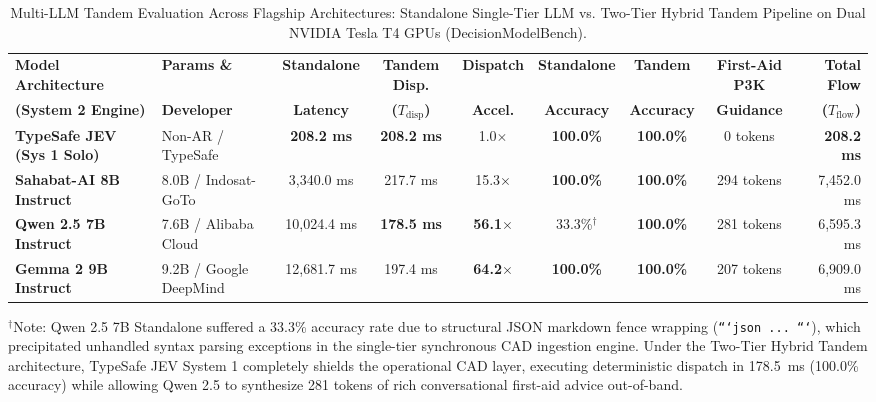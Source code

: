 \documentclass[journal,compsoc]{IEEEtran}
\begin{document}
\begin{table}[t]
\caption{Multi-LLM Tandem Evaluation Across Flagship Architectures: Standalone Single-Tier LLM vs. Two-Tier Hybrid Tandem Pipeline on Dual NVIDIA Tesla T4 GPUs (DecisionModelBench).}
\label{tab:multi_llm_tandem}
\centering
\footnotesize
\setlength{\tabcolsep}{2.5pt}
\begin{tabular*}{\textwidth}{@{\extracolsep{\fill}}llccccccr@{}}
\toprule
\textbf{Model Architecture} & \textbf{Params \&} & \textbf{Standalone} & \textbf{Tandem Disp.} & \textbf{Dispatch} & \textbf{Standalone} & \textbf{Tandem} & \textbf{First-Aid P3K} & \textbf{Total Flow} \\
\textbf{(System 2 Engine)} & \textbf{Developer} & \textbf{Latency} & \textbf{($T_{\text{disp}}$)} & \textbf{Accel.} & \textbf{Accuracy} & \textbf{Accuracy} & \textbf{Guidance} & \textbf{($T_{\text{flow}}$)} \\
\midrule
\textbf{TypeSafe JEV (Sys 1 Solo)} & Non-AR / TypeSafe & \textbf{208.2 ms} & \textbf{208.2 ms} & 1.0$\times$ & \textbf{100.0\%} & \textbf{100.0\%} & 0 tokens & \textbf{208.2 ms} \\
\midrule
\textbf{Sahabat-AI 8B Instruct} & 8.0B / Indosat-GoTo & 3,340.0 ms & 217.7 ms & 15.3$\times$ & \textbf{100.0\%} & \textbf{100.0\%} & 294 tokens & 7,452.0 ms \\
\textbf{Qwen 2.5 7B Instruct} & 7.6B / Alibaba Cloud & 10,024.4 ms & \textbf{178.5 ms} & \textbf{56.1$\times$} & 33.3\%$^\dagger$ & \textbf{100.0\%} & 281 tokens & 6,595.3 ms \\
\textbf{Gemma 2 9B Instruct} & 9.2B / Google DeepMind & 12,681.7 ms & 197.4 ms & \textbf{64.2$\times$} & \textbf{100.0\%} & \textbf{100.0\%} & 207 tokens & 6,909.0 ms \\
\bottomrule
\end{tabular*}
\vspace{1ex}
\begin{flushleft}
\footnotesize{$^\dagger$Note: Qwen 2.5 7B Standalone suffered a 33.3\% accuracy rate due to structural JSON markdown fence wrapping (\texttt{```json ... ```}), which precipitated unhandled syntax parsing exceptions in the single-tier synchronous CAD ingestion engine. Under the Two-Tier Hybrid Tandem architecture, TypeSafe JEV System 1 completely shields the operational CAD layer, executing deterministic dispatch in 178.5~ms (100.0\% accuracy) while allowing Qwen 2.5 to synthesize 281 tokens of rich conversational first-aid advice out-of-band.}
\end{flushleft}
\end{table}
\end{document}
